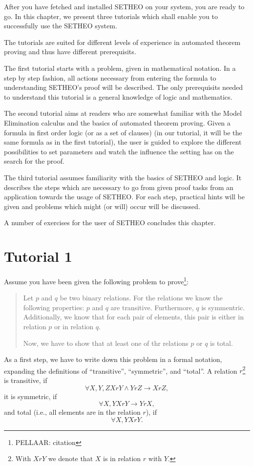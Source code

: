 %
After you have fetched and installed SETHEO on your system,
you are ready to go.
In this chapter, we present three tutorials which shall enable you to
successfully use the SETHEO system.

The tutorials are suited for different levels of experience in
automated theorem proving and thus have  different prerequisits.

The first tutorial starts with a problem, given in mathematical
notation. In a step by step fashion, all actions necessary from entering
the formula to understanding SETHEO's proof will be described.
The only prerequisits needed to understand this tutorial is a general
knowledge of logic and mathematics.

The second tutorial aims at readers who are somewhat familiar 
with the Model Elimination calculus and the basics of automated theorem
proving. Given a formula in first order logic (or as a set of clauses)
(in our tutorial, it will be the same formula as in the first tutorial),
the user is guided to explore the different possibilities to set
parameters and watch the influence the setting has on the search
for the proof.

The third tutorial assumes familiarity with the basics of SETHEO
and logic. It describes the steps which are necessary to go from
given proof tasks from an application towards the usage of SETHEO.
For each step, practical hints will be given and problems which might
(or will) occur will be discussed.

A number of exercises for the user of SETHEO concludes this chapter.

\section{Tutorial 1}

Assume you have been given the following problem to prove\footnote{
	PELLAAR: citation}:
\begin{quote}
Let $p$ and $q$ be two binary relations.
For the relations we know the following properties:
$p$ and $q$ are transitive. Furthermore, $q$ is symmentric.
Additionally, we know that for each pair of elements, this pair is
either in relation $p$ or in relation $q$.

Now, we have to show that at least one of thr relations $p$ or $q$
is total.
\end{quote}

As a first step, we have to write down this problem in a formal
notation, expanding the definitions of ``transitive'', ``symmetric'',
and ``total''. 
A relation $r$\footnote{
	With $XrY$ we denote that $X$ is in relation $r$ with $Y$.
	}
 is transitive, if
\[ \forall X,Y,Z  XrY \wedge YrZ \rightarrow XrZ,\]
it is symmetric, if
\[ \forall X,Y  XrY \rightarrow YrX,\]
and total (i.e., all elements are in the relation $r$), if
\[ \forall X,Y  XrY.\]

